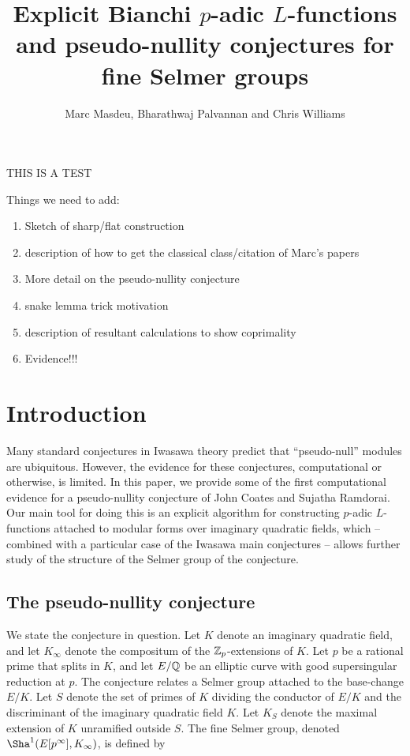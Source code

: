 \documentclass[a4paper,10pt]{article}
\title{Explicit Bianchi $p$-adic $L$-functions and pseudo-nullity conjectures for fine Selmer groups}
\author{Marc Masdeu, Bharathwaj Palvannan and Chris Williams}
\date{}
\numberwithin{equation}{section}
\begin{document}
%
%

\maketitle

THIS IS A TEST

Things we need to add:
\begin{enumerate}
    \item Sketch of sharp/flat construction
    \item description of how to get the classical class/citation of Marc's papers
    \item More detail on the pseudo-nullity conjecture
    \item snake lemma trick motivation
    \item description of resultant calculations to show coprimality
    \item Evidence!!!
\end{enumerate}

\section{Introduction}

Many standard conjectures in Iwasawa theory predict that ``pseudo-null'' modules are ubiquitous. However,  the evidence for these conjectures, computational or otherwise, is limited. In this paper, we provide some of the first computational evidence for a pseudo-nullity conjecture of John Coates and Sujatha Ramdorai. Our main tool for doing this is an explicit algorithm for constructing $p$-adic $L$-functions attached to modular forms over imaginary quadratic fields, which -- combined with a particular case of the Iwasawa main conjectures -- allows further study of the structure of the Selmer group of the conjecture.


\subsection{The pseudo-nullity conjecture}
We state the conjecture in question. Let $K$ denote an imaginary quadratic field, and let $K_\infty$ denote the compositum of the $\mathbb{Z}_p$-extensions of $K$. Let $p$ be a rational prime that splits in $K$, and let $E/\mathbb{Q}$ be an elliptic curve with good supersingular reduction at $p$. The conjecture relates a Selmer group attached to the base-change $E/K$. Let $S$ denote the set of primes of $K$ dividing the conductor of $E/K$ and the discriminant of the imaginary quadratic field $K$. Let $K_S$ denote the maximal extension of $K$ unramified outside $S$. The fine Selmer group, denoted $\Sha^1(E[p^\infty],K_\infty)$, is defined by
\end{document}
